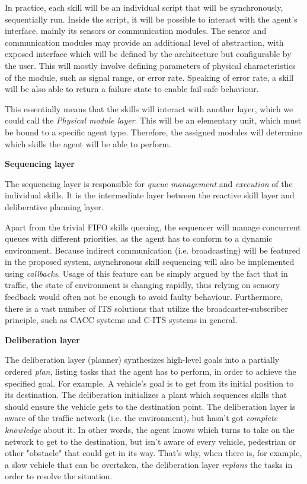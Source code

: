 \documentclass[main.tex]{subfiles}
\begin{document}
In practice, each skill will be an individual script that will be synchronously, sequentially run. Inside 
the script, it will be possible to interact with the agent's interface, mainly its sensors or communication 
modules. The sensor and communication modules may provide an additional level of abstraction,
with exposed interface which will be defined by the architecture but configurable by the user.
This will mostly involve defining parameters of physical characteristics of the module, such 
as signal range, or error rate. Speaking of error rate, a skill will be also able to return a 
failure state to enable fail-safe behaviour. 

This essentially means that the skills will interact with another layer, which we could call the
\emph{Physical module layer}. This will be an elementary unit, which must be bound to a specific agent type. 
Therefore, the assigned modules will determine which skills the agent will be able to perform.  

\textbf{Sequencing layer}

The sequencing layer is responsible for \emph{queue management} and \emph{execution} of the individual skills. It is the 
intermediate layer between the reactive skill layer and deliberative planning layer. 

Apart from the trivial FIFO skills queuing, the sequencer will manage concurrent queues with different 
priorities, as the agent has to conform to a dynamic environment. Because indirect communication (i.e. 
broadcasting) will be featured in the proposed system, asynchronous skill sequencing will also be 
implemented using \emph{callbacks}. Usage of this feature can be simply argued by the fact that in traffic, 
the state of environment is changing rapidly, thus relying on sensory feedback would often not be enough 
to avoid faulty behaviour. Furthermore, there is a vast number of ITS solutions that utilize the 
broadcaster-subscriber principle, such as CACC systems and C-ITS systems in general.

\textbf{Deliberation layer}

The deliberation layer (planner) synthesizes high-level goals into a partially ordered \emph{plan}, listing tasks that 
the agent has to perform, in order to achieve the specified goal. For example, A vehicle's goal is to get from 
its initial position to its destination. The deliberation initializes a plant which sequences skills that 
should ensure the vehicle gets to the destination point. The deliberation layer is aware of the traffic network 
(i.e. the environment), but hasn't got \emph{complete knowledge} about it. In other words, the agent knows which turns
to take on the network to get to the destination, but isn't aware of every vehicle, pedestrian or other "obstacle" that 
could get in its way. That's why, when there is, for example, a slow vehicle that can be overtaken, the deliberation layer 
\emph{replans} the tasks in order to resolve the situation. 
\end{document}
